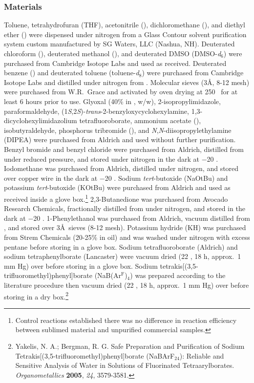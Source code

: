 \subsubsection{Materials}
Toluene, tetrahydrofuran (THF), acetonitrile (),
dichloromethane (), and diethyl ether () were dispensed under nitrogen from a
Glass Contour solvent purification system custom manufactured by SG Waters, LLC (Nashua, NH). Deuterated chloroform
(), deuterated methanol (), and deuterated DMSO (DMSO-\textit{d}$_6$) were
purchased from Cambridge Isotope Labs and used as received. Deuterated benzene () and
deuterated toluene (toluene-\textit{d}$_8$) were purchased from Cambridge Isotope Labs and distilled
under nitrogen from . Molecular sieves (3\AA, 8-12
 mesh) were purchased from W.R.~Grace and activated by oven drying at 250
 \degc\ for at least 6 hours prior to use. Glyoxal (40\% in , w/w), 2-isopropylimidazole,
 paraformaldehyde, (1\textit{S},2\textit{S})-\textit{trans}-2-benzyloxycyclohexylamine,
 1,3-dicyclohexylimidazolium tetrafluoroborate, ammonium acetate (), isobutyraldehyde,
 phosphorus tribromide (), and \textit{N},\textit{N}-diisopropylethylamine (DIPEA) were
 purchased from Aldrich and used without further purification. Benzyl bromide and benzyl chloride
 were purchased from Aldrich, distilled from  under reduced pressure, and stored under
 nitrogen in the dark at $-$20 \degc. Iodomethane was purchased from Aldrich, distilled under
 nitrogen, and stored over copper wire in the dark at $-$20 \degc. Sodium \textit{tert}-butoxide
 (NaOtBu) and potassium \textit{tert}-butoxide (KOtBu) were purchased from Aldrich and used as
 received inside a glove box.\footnote{Control reactions established there was no difference in
 reaction efficiency between sublimed material and unpurified commercial samples.} 2,3-Butanedione
 was purchased from Avocado Research Chemicals, fractionally distilled from  under
 nitrogen, and stored in the dark at $-$20 \degc. 1-Phenylethanol was purchased from Aldrich,
 vacuum distilled from , and stored over 3\AA\ sieves (8-12 mesh). Potassium hydride (KH)
 was purchased from Strem Chemicals (20-25\% in oil) and was washed under nitrogen with excess
 pentane before storing in a glove box. Sodium tetrafluoroborate (Aldrich) and sodium
 tetraphenylborate (Lancaster) were vacuum dried (22 \degc, 18 h, approx.~1 mm Hg) over 
 before storing in a glove box. Sodium tetrakis[(3,5-trifluoromethyl)phenyl]borate
 (NaB(Ar$^\mathrm{F}$)$_4$) was prepared according to the literature procedure then vacuum dried (22 \degc, 18 h, approx.~1 mm Hg) over  before storing in a dry box.\footnote{{\frenchspacing Yakelis, N.
A.; Bergman, R.
G.
Safe Preparation and Purification of Sodium Tetrakis[(3,5-trifluoromethyl)phenyl]borate (NaBArF$_{24}$):
Reliable and Sensitive Analysis of Water in Solutions of Fluorinated Tetraarylborates. \textit{Organometallics} \textbf{2005}, \textit{24}, 3579-3581.}}
